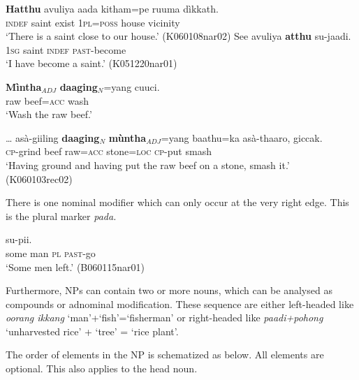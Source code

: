 \ea\label{ex:np:indef}
    \ea
	\gll \textbf{Hatthu} avuliya aada kitham=pe ruuma dìkkath. \\
	    \textsc{indef} saint exist 1\textsc{pl}=\textsc{poss}  house vicinity \\
	    `There is a saint close to our house.' (K060108nar02)
    \ex
	\gll See avuliya \textbf{atthu} su-jaadi. \\
	    1\textsc{sg} saint \textsc{indef} \textsc{past}-become \\
	    `I have become a saint.'  (K051220nar01)
    \z
\z

\ea\label{ex:np:adj}
    \ea
	\gll \textbf{Mìntha}$_{ADJ}$ \textbf{daaging}$_{N}$=yang cuuci. \\ %
	    raw beef=\textsc{acc} wash \\
	    `Wash the raw beef.'

{\dots}
    \ex
	\gll asà-giiling \textbf{daaging}$_{N}$ \textbf{mùntha}$_{ADJ}$=yang baathu=ka asà-thaaro, giccak. \\ %
	    \textsc{cp}-grind beef raw=\textsc{acc} stone=\textsc{loc} \textsc{cp}-put smash  \\
	    `Having ground and having put the raw beef on a stone, smash it.' (K060103rec02)
     \z
\z

 There is one nominal modifier  which can only occur at the very right edge. This is the plural marker \em pada\em.

\ea
{} su-pii. \\
     some man \textsc{pl} \textsc{past}-go  \\
    `Some men left.'  (B060115nar01)
\z

Furthermore, NPs can contain two or more nouns, which can be analysed as compounds or adnominal modification. These sequence are either left-headed like {\em oorang ikkang} `man'+`fish'=`fisherman' or right-headed like {\em paadi+pohong\em} `unharvested rice' + `tree' = `rice plant'.

The order of elements in the NP is schematized as below. All elements are optional. This also applies to the head noun. 

